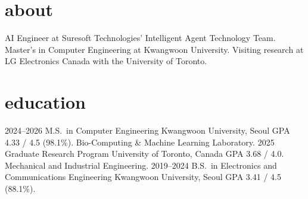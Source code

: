 \documentclass[]{twentysecondcv}
\begin{document}




\makeprofile

\section{about}
AI Engineer at Suresoft Technologies' Intelligent Agent Technology Team.
Master's in Computer Engineering at Kwangwoon University. Visiting research
at LG Electronics Canada with the University of Toronto.

\section{education}
\begin{twenty}
  \twentyitem
    {2024--2026}
    {M.S.\ {\normalfont in Computer Engineering}}
    {Kwangwoon University, Seoul}
    {GPA 4.33 / 4.5 (98.1\%). Bio-Computing \& Machine Learning Laboratory.}
  \twentyitem
    {2025}
    {Graduate Research Program}
    {University of Toronto, Canada}
    {GPA 3.68 / 4.0. Mechanical and Industrial Engineering.}
  \twentyitem
    {2019--2024}
    {B.S.\ {\normalfont in Electronics and Communications Engineering}}
    {Kwangwoon University, Seoul}
    {GPA 3.41 / 4.5 (88.1\%).}
\end{twenty}
\end{document}
